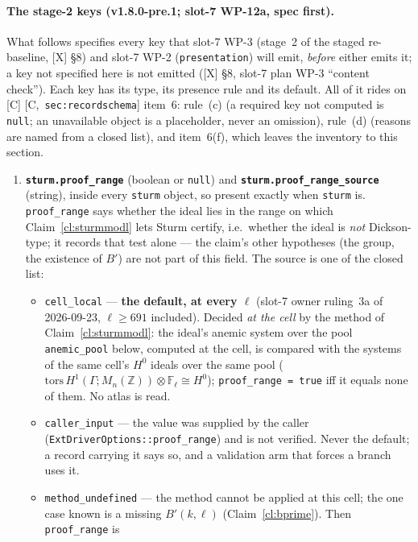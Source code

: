 \documentclass[11pt]{article}
\theoremstyle{remark}
\newcommand{\F}{\mathbb{F}}
\newcommand{\Z}{\mathbb{Z}}
\newcommand{\Ga}{\Gamma}
\newcommand{\Fl}{\F_\ell}
\newcommand{\Mn}{M_n}
\newcommand{\HA}[1]{[C,~\texttt{#1}]}      %
\begin{document}
\paragraph{The stage-2 keys (v1.8.0-pre.1; slot-7 WP-12a, spec first).} What follows
specifies every key that slot-7 WP-3 (stage~2 of the staged re-baseline, [X] \S8) and slot-7
WP-2 (\texttt{presentation}) will emit, \emph{before} either emits it; a key not specified here
is not emitted ([X] \S8, slot-7 plan WP-3 ``content check''). Each key has its type, its
presence rule and its default. All of it rides on [C] \HA{sec:recordschema} item~6: rule~(c)
(a required key not computed is \texttt{null}; an unavailable object is a placeholder, never an
omission), rule~(d) (reasons are named from a closed list), and item~6(f), which leaves the
inventory to this section.
\begin{enumerate}[label=(\alph*)]
\item \textbf{\texttt{sturm.proof\_range}} (boolean or \texttt{null}) and
  \textbf{\texttt{sturm.proof\_range\_source}} (string), inside every \texttt{sturm} object,
  so present exactly when \texttt{sturm} is. \texttt{proof\_range} says whether the ideal lies
  in the range on which Claim~\ref{cl:sturmmodl} lets Sturm certify, i.e.\ whether the ideal is
  \emph{not} Dickson-type; it records that test alone --- the claim's other hypotheses (the
  group, the existence of $B'$) are not part of this field. The source is one of the closed
  list:
  \begin{itemize}
  \item \texttt{cell\_local} --- \textbf{the default, at every $\ell$} (slot-7 owner ruling~3a
    of 2026-09-23, $\ell\ge691$ included). Decided \emph{at the cell} by the method of
    Claim~\ref{cl:sturmmodl}: the ideal's anemic system over the pool \texttt{anemic\_pool}
    below, computed at the cell, is compared with the systems of the same cell's $H^0$ ideals
    over the same pool ($\mathrm{tors}\,H^1(\Ga;\Mn(\Z))\otimes\Fl\cong H^0$);
    \texttt{proof\_range = true} iff it equals none of them. No atlas is read.
  \item \texttt{caller\_input} --- the value was supplied by the caller
    (\texttt{ExtDriverOptions::proof\_range}) and is not verified. Never the default; a record
    carrying it says so, and a validation arm that forces a branch uses it.
  \item \texttt{method\_undefined} --- the method cannot be applied at this cell; the one case
    known is a missing $B'(k,\ell)$ (Claim~\ref{cl:bprime}). Then \texttt{proof\_range} is

\end{itemize}
\end{enumerate}
\end{document}

